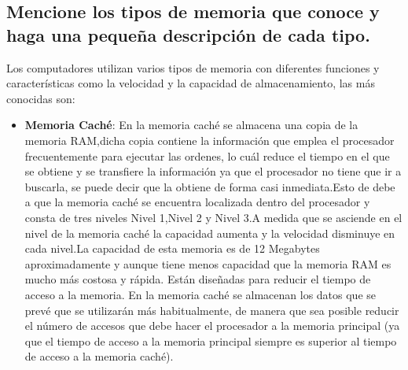 \documentclass{article}
\begin{document}
\subsection{Mencione los tipos de memoria que conoce y haga una pequeña descripción de cada tipo.}
Los computadores utilizan varios tipos de memoria con diferentes funciones y características como la velocidad y la capacidad de almacenamiento, las más conocidas son:
\begin{itemize}
\item \textbf{Memoria Caché}:
    En la memoria caché se almacena una copia de la memoria RAM,dicha copia contiene la información que  emplea el procesador frecuentemente para ejecutar las ordenes, lo cuál reduce el tiempo en el que se obtiene y se transfiere la información ya que el procesador no tiene que ir a buscarla, se puede decir que la obtiene de forma casi inmediata.Esto de debe a que la memoria caché se encuentra localizada dentro del procesador y consta de tres niveles Nivel 1,Nivel 2 y Nivel 3.A medida que se asciende en el nivel de la memoria caché la capacidad aumenta y la velocidad disminuye en cada nivel.La capacidad de esta memoria  es de 12 Megabytes aproximadamente y aunque tiene menos capacidad que la memoria RAM es mucho más costosa y rápida\cite{ref}.\newline
    Están diseñadas para reducir el tiempo de acceso a la memoria. En la memoria caché se almacenan los datos que se prevé que se utilizarán más habitualmente, de manera que sea posible reducir el número de accesos que debe hacer el procesador a la memoria principal (ya que el tiempo de acceso a la memoria principal siempre es superior al tiempo de acceso a la memoria caché)\cite{Orenga}.


\end{itemize}
\end{document}
